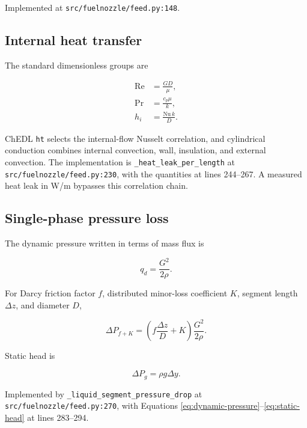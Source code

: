 \documentclass[11pt]{article}
\newcommand{\code}[1]{\nolinkurl{#1}}
\newcommand{\srcline}[2]{\nolinkurl{#1:#2}}
\begin{document}
Implemented at \srcline{src/fuelnozzle/feed.py}{148}.

\subsection{Internal heat transfer}

The standard dimensionless groups are

\begin{align}
  \mathrm{Re} &= \frac{G D}{\mu}, \\
  \mathrm{Pr} &= \frac{c_p\mu}{k}, \\
  h_i &= \frac{\mathrm{Nu}\,k}{D}.
  \label{eq:feed-heat-groups}
\end{align}

ChEDL \code{ht} selects the internal-flow Nusselt correlation, and cylindrical
conduction combines internal convection, wall, insulation, and external convection.
The implementation is \code{_heat_leak_per_length} at
\srcline{src/fuelnozzle/feed.py}{230}, with the quantities at lines 244--267.
A measured heat leak in W/m bypasses this correlation chain.

\subsection{Single-phase pressure loss}

The dynamic pressure written in terms of mass flux is

\begin{equation}
  q_d=\frac{G^2}{2\rho}.
  \label{eq:dynamic-pressure}
\end{equation}

For Darcy friction factor $f$, distributed minor-loss coefficient $K$, segment
length $\Delta z$, and diameter $D$,

\begin{equation}
  \Delta P_{f+K}=\left(f\frac{\Delta z}{D}+K\right)\frac{G^2}{2\rho}.
  \label{eq:darcy-minor-loss}
\end{equation}

Static head is

\begin{equation}
  \Delta P_g=\rho g\Delta y.
  \label{eq:static-head}
\end{equation}

Implemented by \code{_liquid_segment_pressure_drop} at
\srcline{src/fuelnozzle/feed.py}{270}, with Equations
\eqref{eq:dynamic-pressure}--\eqref{eq:static-head} at lines 283--294.
\end{document}
